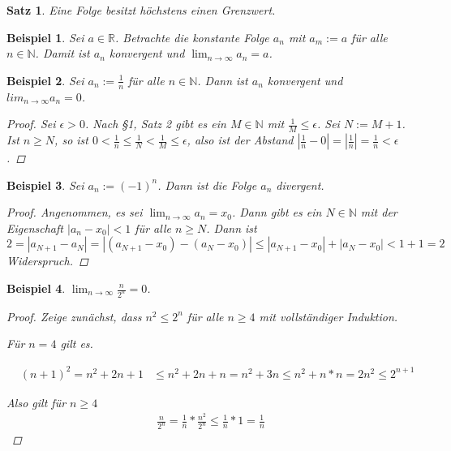 \documentclass[a4paper,10pt]{article}
\newtheorem{satz}{Satz}
\newtheorem{example}{Beispiel}
\begin{document}
\begin{satz}
 Eine Folge besitzt höchstens einen Grenzwert.
\end{satz}

\begin{example}
 Sei $a \in \mathbb{R}$. Betrachte die konstante Folge $a_n$ mit $a_m := a$ für alle $n \in \mathbb{N}$.
 Damit ist $a_n$ konvergent und $\lim_{n \rightarrow \infty} a_n = a$.
\end{example}

\begin{example}
 Sei $a_n := \frac{1}{n}$ für alle $n \in \mathbb{N}$. Dann ist $a_n$ konvergent und $lim_{n \rightarrow \infty} a_n = 0$.
 
 \begin{proof}
  Sei $\epsilon > 0$.
  Nach §1, Satz 2 gibt es ein $M \in \mathbb{N}$ mit $\frac{1}{M} \le \epsilon$.
  Sei $N := M + 1$.
  Ist $n \ge N$, so ist $0 < \frac{1}{n} \le \frac{1}{N} < \frac{1}{M} \le \epsilon$, also ist der Abstand $|\frac{1}{n} - 0| = |\frac{1}{n}| = \frac{1}{n} < \epsilon$.
 \end{proof}
\end{example}

\begin{example}
 Sei $a_n := (-1)^n$.
 Dann ist die Folge $a_n$ divergent.
 
 \begin{proof}
  Angenommen, es sei $\lim_{n \rightarrow \infty} a_n = x_0$.
  Dann gibt es ein $N \in \mathbb{N}$ mit der Eigenschaft $|a_n - x_0| < 1$ für alle $n \ge N$.
  Dann ist $2 = |a_{N + 1} - a_N| = |(a_{N + 1} - x_0) - (a_N - x_0)| \le |a_{N + 1} - x_0| + |a_N - x_0| < 1 + 1 = 2$ Widerspruch.
 \end{proof}
\end{example}

\begin{example}
 $\lim_{n \rightarrow \infty} \frac{n}{2^n} = 0$.
 
 \begin{proof}
  Zeige zunächst, dass $n^2 \le 2^n$ für alle $n \ge 4$ mit vollständiger Induktion.
  
  Für $n = 4$ gilt es.
  
  \begin{align*}
   & (n + 1)^2 = n^2 + 2n + 1
   & \le n^2 + 2n + n = n^2 + 3n \le n^2 + n*n = 2n^2 \le 2^{n + 1}
  \end{align*}

  Also gilt für $n \ge 4$
  \begin{align*}
   \frac{n}{2^n} = \frac{1}{n} * \frac{n^2}{2^n} \le \frac{1}{n} * 1 = \frac{1}{n}
  \end{align*}
 \end{proof}
\end{example}
\end{document}
